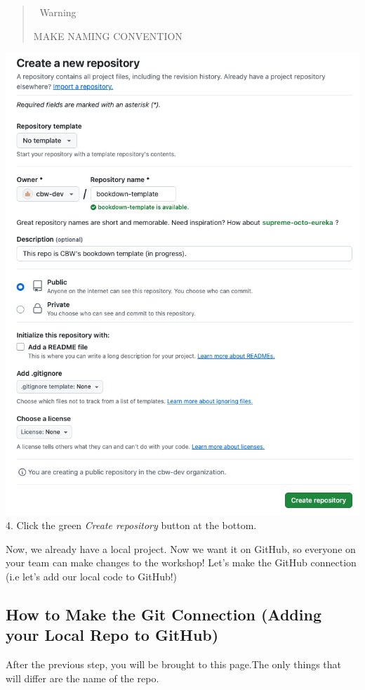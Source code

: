\documentclass[
]{book}
\theoremstyle{definition}
\theoremstyle{definition}
\theoremstyle{definition}
\theoremstyle{definition}
\theoremstyle{remark}
\begin{document}
\begin{quote}
🚧 Warning

MAKE NAMING CONVENTION
\end{quote}

\includegraphics{img/git-instruct/create-git-repo.png}
4. Click the green \emph{Create repository} button at the bottom.

Now, we already have a local project. Now we want it on GitHub, so everyone on your team can make changes to the workshop! Let's make the GitHub connection (i.e let's add our local code to GitHub!)

\subsection{How to Make the Git Connection (Adding your Local Repo to GitHub)}\label{how-to-make-the-git-connection-adding-your-local-repo-to-github}

After the previous step, you will be brought to this page.The only things that will differ are the name of the repo.
\end{document}
